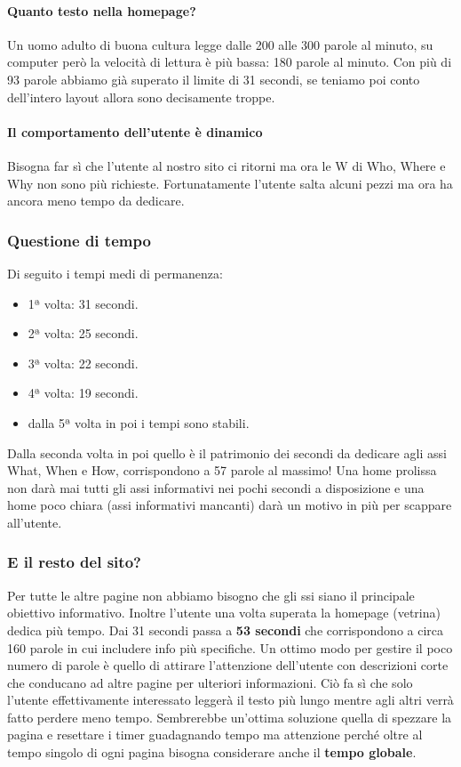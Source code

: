 			\paragraph{Quanto testo nella homepage?} Un uomo adulto di buona cultura legge dalle 200 alle 300 parole al minuto, su computer però la velocità di lettura è più bassa: 180 parole al minuto. Con più di 93 parole abbiamo già superato il limite di 31 secondi, se teniamo poi conto dell'intero layout allora sono decisamente troppe.
			\paragraph{Il comportamento dell'utente è dinamico} Bisogna far sì che l'utente al nostro sito ci ritorni ma ora le W di Who, Where e Why non sono più richieste. Fortunatamente l'utente salta alcuni pezzi ma ora ha ancora meno tempo da dedicare.
			
		\subsubsection{Questione di tempo}	
			Di seguito i tempi medi di permanenza:
			\begin{itemize}
				\item 1ª volta: 31 secondi.
				\item 2ª volta: 25 secondi.
				\item 3ª volta: 22 secondi.
				\item 4ª volta: 19 secondi.
				\item dalla 5ª volta in poi i tempi sono stabili.
			\end{itemize}
			Dalla seconda volta in poi quello è il patrimonio dei secondi da dedicare agli assi What, When e How, corrispondono a 57 parole al massimo!
			Una home prolissa non darà mai tutti gli assi informativi nei pochi secondi a disposizione e una home poco chiara (assi informativi mancanti) darà un motivo in più per scappare all'utente.
			
		\subsubsection{E il resto del sito?}
			Per tutte le altre pagine non abbiamo bisogno che gli ssi siano il principale obiettivo informativo. Inoltre l'utente una volta superata la homepage (vetrina) dedica più tempo. Dai 31 secondi passa a \textbf{53 secondi} che corrispondono a circa 160 parole in cui includere info più specifiche.
			Un ottimo modo per gestire il poco numero di parole è quello di attirare l'attenzione dell'utente con descrizioni corte che conducano ad altre pagine per ulteriori informazioni. Ciò fa sì che solo l'utente effettivamente interessato leggerà il testo più lungo mentre agli altri verrà fatto perdere meno tempo.
			Sembrerebbe un'ottima soluzione quella di spezzare la pagina e resettare i timer guadagnando tempo ma attenzione perché oltre al tempo singolo di ogni pagina bisogna considerare anche il \textbf{tempo globale}.
			
